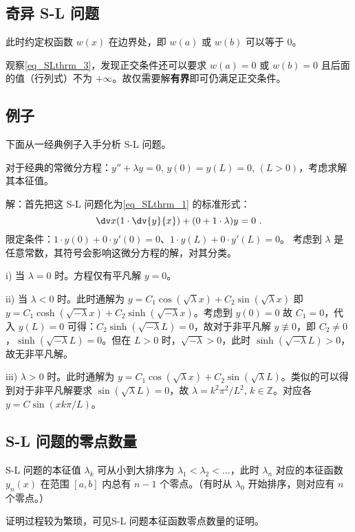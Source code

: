 \subsection{奇异 S-L 问题}
此时约定权函数 $w(x)$ 在边界处，即 $w(a)$ 或 $w(b)$ 可以等于 $0$。

观察\autoref{eq_SLthrm_3}，发现正交条件还可以要求 $w(a) = 0$ 或 $w(b) = 0$ 且后面的值（行列式）不为 $+\infty$。故仅需要解\textbf{有界}即可仍满足正交条件。



\subsection{例子}
下面从一经典例子入手分析 S-L 问题。

\begin{example}{}
对于经典的常微分方程：$y'' + \lambda y = 0$, $y(0) = y(L) = 0$, $(L > 0)$，考虑求解其本征值。
\end{example}
解：首先把这 S-L 问题化为\autoref{eq_SLthrm_1} 的标准形式：
$$\dv x (1 \cdot \dv{y}{x}) + (0 + 1 \cdot \lambda) y = 0~.$$
限定条件：$ 1\cdot y(0) + 0 \cdot y'(0) = 0$、$1 \cdot y(L) + 0 \cdot y'(L) = 0$。
考虑到 $\lambda$ 是任意常数，其符号会影响这微分方程的解，对其分类。

i) 当 $\lambda = 0$ 时。方程仅有平凡解 $y = 0$。

ii) 当 $\lambda < 0$ 时。此时通解为 $y = C_1 \cos(\sqrt{\lambda} x) + C_2 \sin(\sqrt{\lambda} x)$ 即 $y= C_1 \cosh(\sqrt{-\lambda} x) + C_2 \sinh(\sqrt{-\lambda} x)$。考虑到 $y(0)=0$ 故 $C_1 = 0$，代入 $y(L) = 0$ 可得：$C_2 \sinh(\sqrt{-\lambda} L) = 0$，故对于非平凡解 $y \not \equiv 0$，即 $C_2 \neq 0$，$\sinh(\sqrt{-\lambda} L) = 0$。但在 $L>0$ 时，$\sqrt{-\lambda} > 0$，此时 $\sinh(\sqrt{-\lambda} L) > 0$，故无非平凡解。

iii) $\lambda > 0$ 时。此时通解为 $y = C_1 \cos(\sqrt{\lambda} x) + C_2 \sin(\sqrt{\lambda} L)$。类似的可以得到对于非平凡解要求 $\sin(\sqrt \lambda L) = 0$，故 $\lambda = k^2 \pi^2/L^2$, $k \in \mathbb Z$。对应各 $y = C \sin(x k\pi/L )$。

\subsection{S-L 问题的零点数量}
S-L 问题的本征值 $\lambda_k$ 可从小到大排序为 $\lambda_1 < \lambda_2 < \dots$，此时 $\lambda_n$ 对应的本征函数 $y_n(x)$ 在范围 $[a, b]$ 内总有 $n-1$ 个零点。（有时从 $\lambda_0$ 开始排序，则对应有 $n$ 个零点。）

证明过程较为繁琐，可见S-L 问题本征函数零点数量的证明。